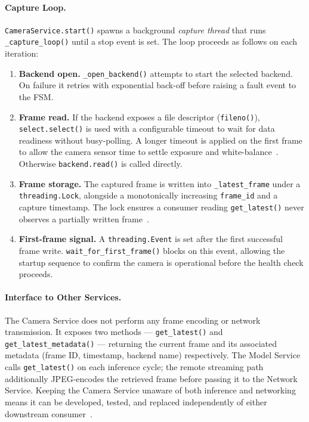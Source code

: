 \paragraph{Capture Loop.}
 
\texttt{CameraService.start()} spawns a background \emph{capture
thread} that runs \texttt{\_capture\_loop()} until a stop event is
set. The loop proceeds as follows on each iteration:
 
\begin{enumerate}
    \item \textbf{Backend open.} \texttt{\_open\_backend()} attempts
          to start the selected backend. On failure it retries with
          exponential back-off before raising a fault event to the
          FSM.
 
    \item \textbf{Frame read.} If the backend exposes a file
          descriptor (\texttt{fileno()}), \texttt{select.select()} is
          used with a configurable timeout to wait for data readiness
          without busy-polling. A longer timeout is applied on the
          first frame to allow the camera sensor time to settle
          exposure and white-balance~\cite{picamera2023}. Otherwise
          \texttt{backend.read()} is called directly.
 
    \item \textbf{Frame storage.} The captured frame is written into
          \texttt{\_latest\_frame} under a \texttt{threading.Lock},
          alongside a monotonically increasing \texttt{frame\_id} and
          a capture timestamp. The lock ensures a consumer reading
          \texttt{get\_latest()} never observes a partially written
          frame~\cite{silberschatz2018os}.
 
    \item \textbf{First-frame signal.} A \texttt{threading.Event} is
          set after the first successful frame write.
          \texttt{wait\_for\_first\_frame()} blocks on this event,
          allowing the startup sequence to confirm the camera is
          operational before the health check proceeds.
\end{enumerate}
 
\paragraph{Interface to Other Services.}
 
The Camera Service does not perform any frame encoding or network
transmission. It exposes two methods — \texttt{get\_latest()} and
\texttt{get\_latest\_metadata()} — returning the current frame and
its associated metadata (frame ID, timestamp, backend name)
respectively. The Model Service calls \texttt{get\_latest()} on each
inference cycle; the remote streaming path additionally JPEG-encodes
the retrieved frame before passing it to the Network Service. Keeping
the Camera Service unaware of both inference and networking means it
can be developed, tested, and replaced independently of either
downstream consumer~\cite{martin2008clean}.
 
